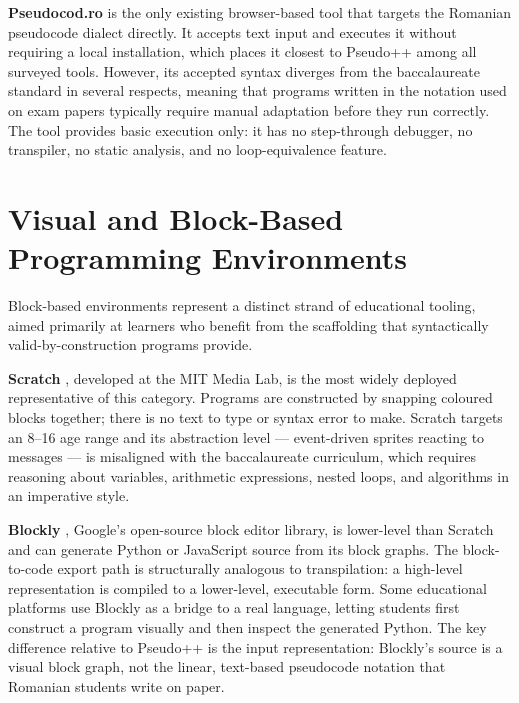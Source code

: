 \textbf{Pseudocod.ro} \cite{pseudocodro} is the only existing browser-based
tool that targets the Romanian pseudocode dialect directly.  It accepts
text input and executes it without requiring a local installation, which
places it closest to Pseudo++ among all surveyed tools.  However, its
accepted syntax diverges from the baccalaureate standard in several
respects, meaning that programs written in the notation used on exam
papers typically require manual adaptation before they run correctly.
The tool provides basic execution only: it has no step-through debugger,
no transpiler, no static analysis, and no loop-equivalence feature.

\section{Visual and Block-Based Programming Environments}
\label{sec:educational-interpreters}

Block-based environments represent a distinct strand of educational
tooling, aimed primarily at learners who benefit from the scaffolding
that syntactically valid-by-construction programs provide.

\textbf{Scratch} \cite{scratch}, developed at the MIT Media Lab, is the
most widely deployed representative of this category.  Programs are
constructed by snapping coloured blocks together; there is no text to
type or syntax error to make.  Scratch targets an 8--16 age range and
its abstraction level --- event-driven sprites reacting to messages ---
is misaligned with the baccalaureate curriculum, which requires reasoning
about variables, arithmetic expressions, nested loops, and algorithms in
an imperative style.

\textbf{Blockly} \cite{blockly}, Google's open-source block editor
library, is lower-level than Scratch and can generate Python or
JavaScript source from its block graphs.  The block-to-code export path
is structurally analogous to transpilation: a high-level representation
is compiled to a lower-level, executable form.  Some educational
platforms use Blockly as a bridge to a real language, letting students
first construct a program visually and then inspect the generated
Python.  The key difference relative to Pseudo++ is the input
representation: Blockly's source is a visual block graph, not the
linear, text-based pseudocode notation that Romanian students write on
paper.

